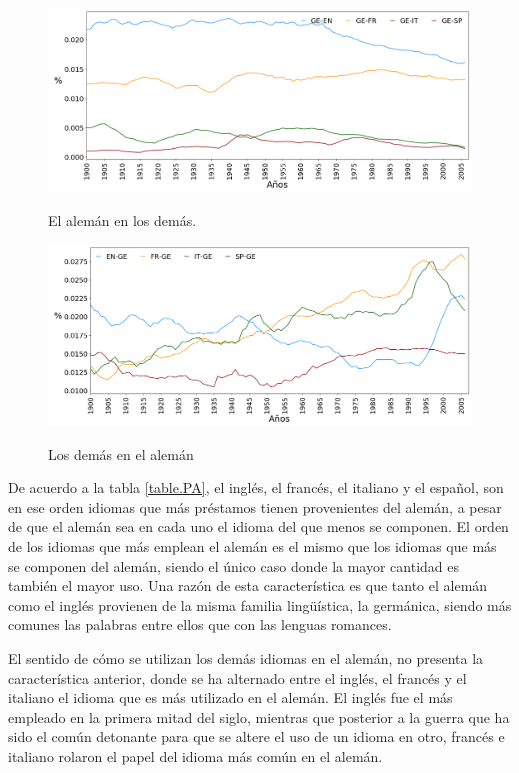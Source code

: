 \begin{figure}[h!]
	\centering
	\includegraphics[scale=.36]{Cap_4/PF1_S2_GE.png}
	\label{fig.ST_a_GE}
	\caption{El alemán en los demás.}
\end{figure}


\begin{figure}[h!]
	\centering
	\includegraphics[scale=.36]{Cap_4/PF2_S2_GE.png}
	\label{fig.ST_b_GE}
	\caption{Los demás en el alemán}
\end{figure}


\clearpage

De acuerdo a la tabla \ref{table.PA},  el inglés, el francés, el italiano y el español, son en ese orden idiomas que más préstamos tienen provenientes del alemán, a pesar de que el alemán sea en cada uno el idioma del que menos se componen.  El orden de los idiomas que más emplean el alemán es el mismo que los idiomas que más se componen del alemán, siendo el único caso donde la mayor cantidad es también el mayor uso. Una razón de esta característica es que tanto el alemán como el inglés provienen de la misma familia lingüística, la germánica,  siendo más comunes las palabras entre ellos  que con las lenguas romances.

El sentido de cómo se utilizan los demás idiomas en el alemán, no presenta la característica anterior,   donde se ha alternado entre el inglés, el francés y el italiano el idioma que es más utilizado en el alemán.  El inglés fue el más empleado en la primera mitad del siglo, mientras que posterior a la guerra que ha sido el común detonante para que se altere el uso de un idioma en otro,  francés e italiano rolaron el papel del idioma más común en el alemán. 


